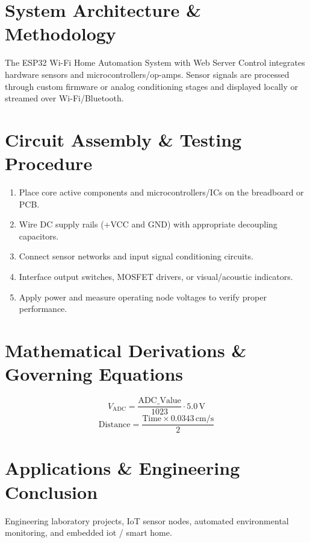 \documentclass[11pt,a4paper]{article}
\begin{document}
\section{System Architecture \& Methodology}
The ESP32 Wi-Fi Home Automation System with Web Server Control integrates hardware sensors and microcontrollers/op-amps. Sensor signals are processed through custom firmware or analog conditioning stages and displayed locally or streamed over Wi-Fi/Bluetooth.

\section{Circuit Assembly \& Testing Procedure}
\begin{enumerate}
    \item Place core active components and microcontrollers/ICs on the breadboard or PCB.
    \item Wire DC supply rails (+VCC and GND) with appropriate decoupling capacitors.
    \item Connect sensor networks and input signal conditioning circuits.
    \item Interface output switches, MOSFET drivers, or visual/acoustic indicators.
    \item Apply power and measure operating node voltages to verify proper performance.
\end{enumerate}

\section{Mathematical Derivations \& Governing Equations}
\begin{equation}
V_{\text{ADC}} = \frac{\text{ADC\_Value}}{1023} \cdot 5.0\,\text{V}
\end{equation}
\begin{equation}
\text{Distance} = \frac{\text{Time} \times 0.0343\,\text{cm/s}}{2}
\end{equation}

\section{Applications \& Engineering Conclusion}
Engineering laboratory projects, IoT sensor nodes, automated environmental monitoring, and embedded iot / smart home.
\end{document}

